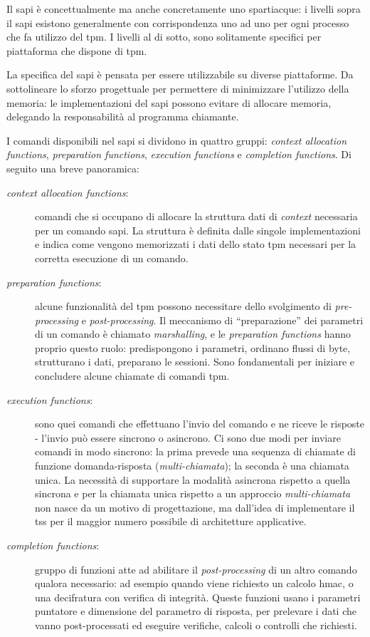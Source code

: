 Il \acrshort{sapi} è concettualmente ma anche concretamente uno spartiacque: i livelli sopra il \acrshort{sapi} esistono generalmente con corrispondenza uno ad uno per ogni processo che fa utilizzo del \acrshort{tpm}. I livelli al di sotto, sono solitamente specifici per piattaforma che dispone di \acrshort{tpm}.

La specifica del \acrshort{sapi} è pensata per essere utilizzabile su diverse piattaforme. Da sottolineare lo sforzo progettuale per permettere di minimizzare l'utilizzo della memoria: le implementazioni del \acrshort{sapi} possono evitare di allocare memoria, delegando la responsabilità al programma chiamante.

I comandi disponibili nel \acrshort{sapi} si dividono in quattro gruppi: \textit{context allocation functions}, \textit{preparation functions}, \textit{execution functions} e \textit{completion functions}. Di seguito una breve panoramica:

\begin{description}
    \item[\textit{context allocation functions}:] comandi che si occupano di allocare la struttura dati di \textit{context} necessaria per un comando \acrshort{sapi}. La struttura è definita dalle singole implementazioni e indica come vengono memorizzati i dati dello stato \acrshort{tpm} necessari per la corretta esecuzione di un comando.
    
    \item[\textit{preparation functions}:] alcune funzionalità del \acrshort{tpm} possono necessitare dello svolgimento di \textit{pre-processing} e \textit{post-processing}. Il meccanismo di ``preparazione'' dei parametri di un comando è chiamato \textit{marshalling}, e le \textit{preparation functions} hanno proprio questo ruolo: predispongono i parametri, ordinano flussi di byte, strutturano i dati, preparano le sessioni. Sono fondamentali per iniziare e concludere alcune chiamate di comandi \acrshort{tpm}.
    
    \item[\textit{execution functions}:] sono quei comandi che effettuano l'invio del comando e ne riceve le risposte - l'invio può essere sincrono o asincrono. Ci sono due modi per inviare comandi in modo sincrono: la prima prevede una sequenza di chiamate di funzione domanda-risposta (\textit{multi-chiamata}); la seconda è una chiamata unica. La necessità di supportare la modalità asincrona rispetto a quella sincrona e per la chiamata unica rispetto a un approccio \textit{multi-chiamata} non nasce da un motivo di progettazione, ma dall'idea di implementare il \acrshort{tss} per il maggior numero possibile di architetture applicative.
    
    \item[\textit{completion functions}:] gruppo di funzioni atte ad abilitare il \textit{post-processing} di un altro comando qualora necessario: ad esempio quando viene richiesto un calcolo \acrshort{hmac}, o una decifratura con verifica di integrità. Queste funzioni usano i parametri puntatore e dimensione del parametro di risposta, per prelevare i dati che vanno post-processati ed eseguire verifiche, calcoli o controlli che richiesti.
\end{description}


